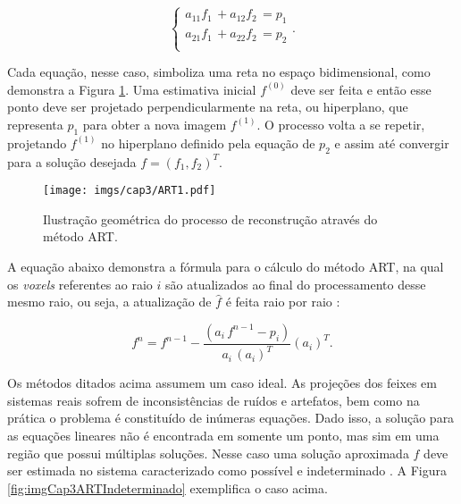 {{\begin{equation}
\begin{cases}
a_{11}f_{1} \, + a_{12}f_{2} \, = p_{1} \\ 
a_{21}f_{1} \, + a_{22}f_{2} \, = p_{2} \\  
\end{cases}.
\label{eq:eqCap3ARTEquacoesLineares}
\end{equation}

Cada equação, nesse caso, simboliza uma reta no espaço bidimensional, como demonstra a Figura \ref{fig:imgCap3ART}. Uma estimativa inicial $f^{(0)}$ deve ser feita e então esse ponto deve ser projetado perpendicularmente na reta, ou hiperplano, que representa $p_{1}$ para obter a nova imagem $f^{(1)}$. O processo volta a se repetir, projetando $f^{(1)}$ no hiperplano definido pela equação de $p_{2}$ e assim até convergir para a solução desejada $f = (f_{1},f_{2})^{T}$.


\begin{figure}[H]
	\caption{Ilustração geométrica do processo de reconstrução através do método \acs{ART}.}
	\begin{center}
		\texttt{[image: imgs/cap3/ART1.pdf]}
	\end{center}
	\label{fig:imgCap3ART}
\end{figure} 

A equação abaixo demonstra a fórmula para o cálculo do método \acs{ART}, na qual os \textit{voxels} referentes ao raio $i$ são atualizados ao final do processamento desse mesmo raio, ou seja, a atualização de $\hat{f}$ é feita raio por raio \cite{buzug2008computed, levakhina2014three}:


\begin{equation}
f^{n} = f^{n-1} - \dfrac{(a_{i} \, f^{n-1}- p_{i})}{a_{i}\,(a_{i})^{T}}   (a_{i})^{T}   .  
\label{eq:eqCap3ARTEquacao}
\end{equation}


Os métodos ditados acima assumem um caso ideal. As projeções dos feixes em sistemas reais sofrem de inconsistências de ruídos e artefatos, bem como na prática o problema é constituído de inúmeras equações. Dado isso, a solução para as equações lineares não é encontrada em somente um ponto, mas sim em uma região que possui múltiplas soluções. Nesse caso uma solução aproximada $\hat{f}$ deve ser estimada no sistema caracterizado como possível e indeterminado \cite[p. 218]{buzug2008computed}. A Figura \ref{fig:imgCap3ARTIndeterminado} exemplifica o caso acima. 

}}
